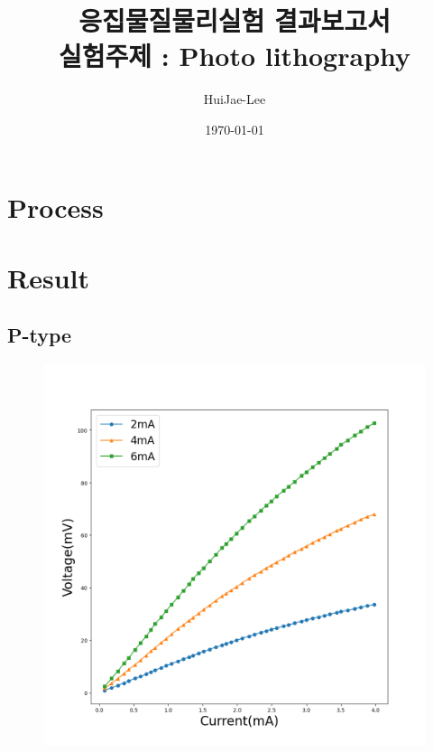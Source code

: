 \documentclass[aps,reprint,superscriptaddress,10pt]{revtex4-2}
\begin{document}
\title{응집물질물리실험 결과보고서 \\
\small 실험주제 : Photo lithography}

\author{HuiJae-Lee}

\date{\today}


\begin{abstract}

 \end{abstract}
 
 \maketitle
 
\section{Process}

\section{Result}
\subsection{P-type}

\begin{figure}[htbp]
  \centering
  \includegraphics[scale = 0.15]{Hall_p.png}
  \caption{}
  \label{fig:p}
\end{figure}
\end{document}
